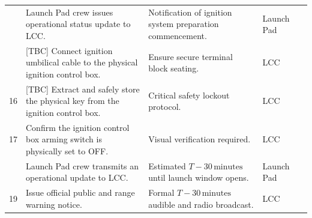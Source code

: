 \documentclass[11pt,a4paper]{article}
\begin{document}
\begin{xltabular}{\textwidth}{|>{\centering\arraybackslash}p{0.6cm}|X|X|>{\centering\arraybackslash}p{2.8cm}|>{\centering\arraybackslash}p{1.0cm}|}
     \\  & Launch Pad crew issues operational status update to LCC. & Notification of ignition system preparation commencement. & Launch Pad & \\  & [TBC] Connect ignition umbilical cable to the physical ignition control box. & Ensure secure terminal block seating. & LCC & \\ \hline
    16 & [TBC] Extract and safely store the physical key from the ignition control box. & Critical safety lockout protocol. & LCC & \\ \hline
    17 & Confirm the ignition control box arming switch is physically set to OFF. & Visual verification required. & LCC & \\  & Launch Pad crew transmits an operational update to LCC. & Estimated $T-30\,\text{minutes}$ until launch window opens. & Launch Pad & \\ \hline
    19 & Issue official public and range warning notice. & Formal $T-30\,\text{minutes}$ audible and radio broadcast. & LCC & \\ \hline
    

\end{xltabular}
\end{document}
